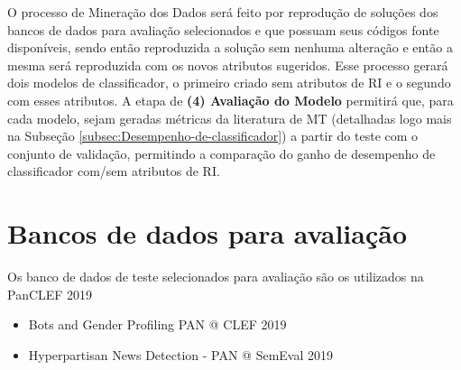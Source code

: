     O processo de Mineração dos Dados será feito por reprodução de soluções dos bancos de dados para avaliação selecionados e que possuam seus códigos fonte disponíveis, sendo então reproduzida a solução sem nenhuma alteração e então a mesma será reproduzida com os novos atributos sugeridos.
    Esse processo gerará dois modelos de classificador, o primeiro criado sem atributos de RI e o segundo com esses atributos.
    A etapa de \textbf{(4) Avaliação do Modelo} permitirá que, para cada modelo, sejam geradas métricas da literatura de MT (detalhadas logo mais na Subseção \ref{subsec:Desempenho-de-classificador}) a partir do teste com o conjunto de validação, permitindo a comparação do ganho de desempenho de classificador com/sem atributos de RI.
    
    
    

\section{Bancos de dados para avaliação}  \label{sec:Bancos-de-dados-para-avaliação}
    Os banco de dados de teste selecionados para avaliação são os utilizados na PanCLEF 2019 %

    \begin{itemize}
        \item Bots and Gender Profiling PAN @ CLEF 2019
        \item Hyperpartisan News Detection - PAN @ SemEval 2019
    \end{itemize}

